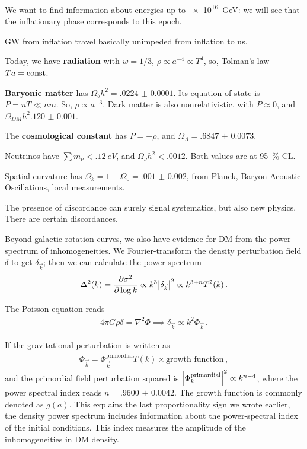 \documentclass[main.tex]{subfiles}
\begin{document}
We want to find information about energies up to \SI{e16}{GeV}: we will see that the inflationary phase corresponds to this epoch.

GW from inflation travel basically unimpeded from inflation to us. 

Today, we have \textbf{radiation} with \(w = 1/3\), \(\rho \propto a^{-4} \propto T^{4} \), so, Tolman's law \(Ta = \text{const}\). 

\textbf{Baryonic matter} has \(\Omega_b h^2 = \num{.0224(1)}\).
Its equation of state is \(P = nT \ll nm\). So,  \(\rho \propto a^{-3}\). 
Dark matter is also nonrelativistic, with \(P \approx 0\), and \(\Omega_{DM} h^2 \num{.120(1)}\).

The \textbf{cosmological constant} has \(P = - \rho \), and \(\Omega _\Lambda = \num{.6847(73)}\). 

Neutrinos have \(\sum m_\nu < \SI{.12}{eV}\), and \(\Omega _\nu h^2 < \num{.0012}\). Both values are at \SI{95}{\percent} CL. 

Spatial curvature has \(\Omega _k = 1- \Omega_0 = \num{.001(2)}\), from Planck, Baryon Acoustic Oscillations, local measurements.

The presence of discordance can surely signal systematics, but also new physics. There are certain discordances. 

Beyond galactic rotation curves, we also have evidence for DM from the power spectrum of inhomogeneities. 
We Fourier-transform the density perturbation field \(\delta \) to get \(\delta _{\vec{k}}\); then we can calculate the power spectrum 
%
\begin{align}
\Delta^2 (k) = \pdv{ \sigma^2}{\log k} \propto k^3 \abs{ \delta _{\vec{k}}}^2 \propto k^{3+n} T^2 (k)
\,.
\end{align}

The Poisson equation reads 
%
\begin{align}
4 \pi G \overline{\rho} \delta = \nabla^2 \Phi \implies \delta _{\vec{k}} \propto k^2 \Phi_{\vec{k}}
\,.
\end{align}

If the gravitational perturbation is written as 
%
\begin{align}
\Phi _{\vec{k}} = \Phi _{\vec{k}}^{\text{primordial}} T(k) \times \text{growth function}
\,,
\end{align}
%
and the primordial field perturbation squared is \(\abs{\Phi _k^{\text{primordial}}}^2 \propto k^{n-4}\), where the power spectral index reads \(n =\num{.9600(42)}\).
The growth function is commonly denoted as \(g(a)\). 
This explains the last proportionality sign we wrote earlier, the density power spectrum includes information about the power-spectral index of the initial conditions. This index measures the amplitude of the inhomogeneities in DM density. 
\end{document}
